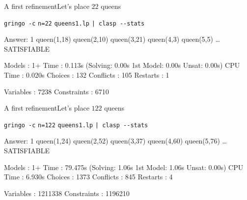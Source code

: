 \begin{frame}[fragile]{A first refinement}{Let's place \alert{$22$} queens}
\begin{block}{\alert<1>{\lstinline{gringo -c} \alert{\lstinline{n=22}} \lstinline{queens1.lp} \lstinline{| clasp --stats}}}
\vspace*{-3mm}
\pause\footnotesize%
\begin{semiverbatim}
Answer: 1
queen(1,18) queen(2,10) queen(3,21) queen(4,3) queen(5,5) \dots{}
SATISFIABLE

Models      : 1+
\alert<2>{Time        : 0.113s} (Solving: 0.00s 1st Model: 0.00s Unsat: 0.00s)
CPU Time    : 0.020s
Choices     : 132
\alert<2>{Conflicts   : 105}
Restarts    : 1

Variables   : 7238
Constraints : 6710
\end{semiverbatim}
\end{block}
\end{frame}
\begin{frame}[fragile]{A first refinement}{Let's place \alert{$122$} queens}
\begin{block}{\alert<1>{\lstinline{gringo -c} \alert{\lstinline{n=122}} \lstinline{queens1.lp} \lstinline{| clasp --stats}}}
\vspace*{-3mm}
\pause\footnotesize%
\begin{semiverbatim}
Answer: 1
queen(1,24) queen(2,52) queen(3,37) queen(4,60) queen(5,76) \dots{}
SATISFIABLE

Models      : 1+
\alert<2>{Time        : 79.475s} (\alert<2>{Solving: 1.06s} 1st Model: 1.06s Unsat: 0.00s)
CPU Time    : 6.930s
Choices     : 1373
\alert<2>{Conflicts   : 845}
Restarts    : 4

\alert<3>{Variables   : 1211338}
\alert<3>{Constraints : 1196210}
\end{semiverbatim}
\end{block}
\end{frame}
